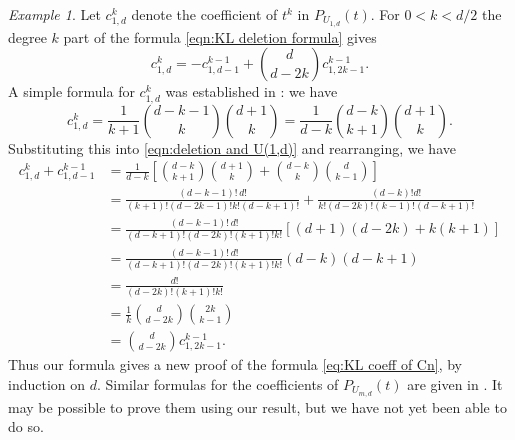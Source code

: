 \documentclass[12pt,reqno]{amsart}
\theoremstyle{definition}
\theoremstyle{remark}
\newtheorem{example}[theorem]{Example}
\renewcommand{\(}{\left(}
\renewcommand{\)}{\right)}
\newcommand{\<}{\left<}
\renewcommand{\>}{\right>}
\begin{document}
\begin{example}
Let $c^k_{1,d}$ denote the coefficient of $t^k$ in $P_{U_{1,d}}(t)$.  For  $0 < k < d/2$ the degree $k$ part of the formula \eqref{eqn:KL deletion formula} gives
\begin{equation}\label{eqn:deletion and U(1,d)}
c^k_{1,d} = - c^{k-1}_{1,d-1} + \binom{d}{d-2k}c^{k-1}_{1,2k-1}.
\end{equation}
A simple formula for $c^k_{1,d}$ was established 
in \cite{PWY}: we have
\begin{equation}\label{eq:KL coeff of Cn} 
c^k_{1,d} = \frac{1}{k+1}\binom{d-k-1}{k}\binom{d+1}{k} = \frac{1}{d-k}\binom{d-k}{k+1}\binom{d+1}{k}.
\end{equation}
Substituting this into \eqref{eqn:deletion and U(1,d)} and rearranging, we have
\begin{align*}
c^k_{1,d} + c^{k-1}_{1,d-1} & = \frac{1}{d-k}\left[\binom{d-k}{k+1}\binom{d+1}{k} + \binom{d-k}{k}\binom{d}{k-1}\right] \\
&=\frac{(d-k-1)! \,d!}{(k+1)!(d-2k-1)!k!(d-k+1)!}+\frac{(d-k)! d!}{k!(d-2k)!(k-1)!(d-k+1)!}\\
&=
\frac{(d-k-1)!\,d!}{(d-k+1)!(d-2k)!(k+1)!k!}\left[(d+1)(d-2k) + k(k+1)\right]\\
&= \frac{(d-k-1)!\,d!}{(d-k+1)!(d-2k)!(k+1)!k!}(d-k)(d-k+1) \\
&=\frac{d!}{(d-2k)!(k+1)!k!} \\
&= \frac{1}{k}\binom{d}{d-2k}\binom{2k}{k-1}\\
&=\binom{d}{d-2k}c^{k-1}_{1,2k-1}.
\end{align*}
Thus our formula gives a new proof of the formula \eqref{eq:KL coeff of Cn}, by induction on $d$.  Similar formulas for the coefficients of $P_{U_{m,d}}(t)$ are given in \cite{GLXYZ}.  It may be possible to prove them using our result, but we have not yet been able to do so.
\end{example}
\end{document}
